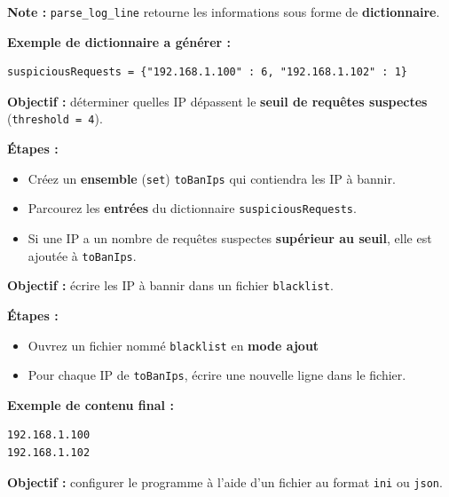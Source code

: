 \documentclass[12pt, a4paper]{exam}
\begin{document}
\begin{questions}
  \textbf{Note :} \texttt{parse\_log\_line} retourne les informations sous forme de \textbf{dictionnaire}.

  \textbf{Exemple de dictionnaire a générer :}
  \begin{verbatim}
suspiciousRequests = {"192.168.1.100" : 6, "192.168.1.102" : 1}
\end{verbatim}


  \textbf{Objectif :} déterminer quelles IP dépassent le \textbf{seuil de requêtes suspectes} (\texttt{threshold = 4}).

  \textbf{Étapes :}
  \begin{itemize}
    \item Créez un \textbf{ensemble} (\texttt{set}) \texttt{toBanIps} qui contiendra les
          IP à bannir.
    \item Parcourez les \textbf{entrées} du dictionnaire \texttt{suspiciousRequests}.
    \item Si une IP a un nombre de requêtes suspectes \textbf{supérieur au seuil}, elle
          est ajoutée à \texttt{toBanIps}.
  \end{itemize}

  \newpage


  \textbf{Objectif :} écrire les IP à bannir dans un fichier \texttt{blacklist}.

  \textbf{Étapes :}
  \begin{itemize}
    \item Ouvrez un fichier nommé \texttt{blacklist} en \textbf{mode ajout}
    \item Pour chaque IP de \texttt{toBanIps}, écrire une nouvelle ligne dans le fichier.
  \end{itemize}

  \textbf{Exemple de contenu final :}
  \begin{verbatim}
192.168.1.100
192.168.1.102
\end{verbatim}


  \textbf{Objectif :} configurer le programme à l'aide d'un fichier au format \texttt{ini} ou \texttt{json}.


\end{questions}
\end{document}

